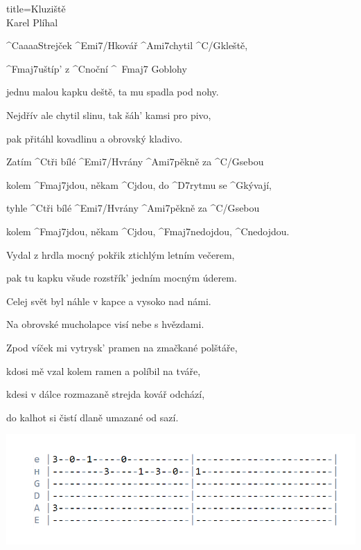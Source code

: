 \begin{song}{title=\predtitle\centering Kluziště \\\large Karel Plíhal \vspace*{-0.3cm}}  %
\begin{centerjustified}
\nejvetsi

\sloka 
	^{C{\color{white}aaaa}}Strejček ^{Emi7/H}kovář ^{Ami7}chytil ^{C/G}kleště, 

	^{Fmaj7}uštíp' z ^{C}noční ^{\,\,\,Fmaj7\,\,G}oblohy
	
	jednu malou kapku deště, ta mu spadla pod nohy.
	
	Nejdřív ale chytil slinu, tak šáh' kamsi pro pivo,
	
	pak přitáhl kovadlinu a obrovský kladivo.

	Zatím ^{C}tři bílé ^{Emi7/H}vrány ^{Ami7}pěkně za ^{C/G}sebou
	
	kolem ^{Fmaj7}jdou, někam ^{C}jdou, do ^{D7}rytmu se ^{G}kývají,

	tyhle ^{C}tři bílé ^{Emi7/H}vrány ^{Ami7}pěkně za ^{C/G}sebou
	
	kolem ^{Fmaj7}jdou, někam ^{C}jdou, ^{Fmaj7}nedojdou, ^{C}nedojdou.


\sloka	
	Vydal z hrdla mocný pokřik ztichlým letním večerem,
	
	pak tu kapku všude rozstřík' jedním mocným úderem.
	
	Celej svět byl náhle v kapce a vysoko nad námi.
	
	Na obrovské mucholapce visí nebe s hvězdami.


\sloka
	Zpod víček mi vytrysk' pramen na zmačkané polštáře,
	
	kdosi mě vzal kolem ramen a políbil na tváře,
	
	kdesi v dálce rozmazaně strejda kovář odchází,
	
	do kalhot si čistí dlaně umazané od sazí. 


\includegraphics[scale=0.5]{../taby/kluziste.PNG}
\end{centerjustified}
\setcounter{Slokočet}{0}
\end{song}
